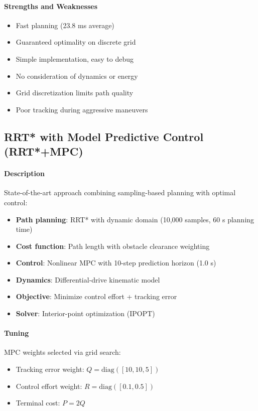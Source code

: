 \paragraph{Strengths and Weaknesses}
\begin{itemize}
    \item[\textcolor{green}{+}] Fast planning (23.8 ms average)
    \item[\textcolor{green}{+}] Guaranteed optimality on discrete grid
    \item[\textcolor{green}{+}] Simple implementation, easy to debug
    \item[\textcolor{red}{--}] No consideration of dynamics or energy
    \item[\textcolor{red}{--}] Grid discretization limits path quality
    \item[\textcolor{red}{--}] Poor tracking during aggressive maneuvers
\end{itemize}

\subsection{RRT* with Model Predictive Control (RRT*+MPC)}

\paragraph{Description}
State-of-the-art approach combining sampling-based planning with optimal control:
\begin{itemize}
    \item \textbf{Path planning}: RRT* with dynamic domain (10,000 samples, 60 s planning time)
    \item \textbf{Cost function}: Path length with obstacle clearance weighting
    \item \textbf{Control}: Nonlinear MPC with 10-step prediction horizon (1.0 s)
    \item \textbf{Dynamics}: Differential-drive kinematic model
    \item \textbf{Objective}: Minimize control effort + tracking error
    \item \textbf{Solver}: Interior-point optimization (IPOPT)
\end{itemize}

\paragraph{Tuning}
MPC weights selected via grid search:
\begin{itemize}
    \item Tracking error weight: $Q = \text{diag}([10, 10, 5])$
    \item Control effort weight: $R = \text{diag}([0.1, 0.5])$
    \item Terminal cost: $P = 2Q$
\end{itemize}

